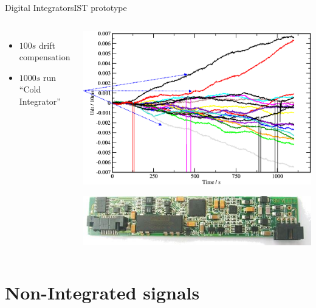 \documentclass{beamer}
\begin{document}
\begin{frame}{Digital Integrators}{IST prototype}
\begin{columns}
	\begin{itemize}
		\item $100 s$ drift  compensation
		\item $1000 s$ run “Cold Integrator”
	\end{itemize}
	\begin{center}
		\includegraphics[height = 3 cm]{w7xDrift.png}

		\includegraphics[height = 1 cm]{AtcaAdc.jpg}
	\end{center}
\end{columns}
\end{frame}



\section{Non-Integrated signals}

\end{document}
